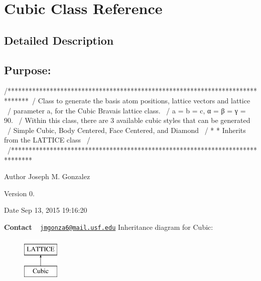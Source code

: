 \hypertarget{class_cubic}{}\section{Cubic Class Reference}
\label{class_cubic}


\subsection{Detailed Description}
\subsection*{{\bfseries Purpose\+:} }

\begin{DoxyVerb}/******************************************************************************\
/  Class to generate the basis atom positions, lattice vectors and lattice     \
/  parameter a, for the Cubic Bravais lattice class.                           \
/  a = b = c, α = β = γ = 90.                                                  \
/  Within this class, there are 3 available cubic styles that can be generated \
/  Simple Cubic, Body Centered, Face Centered, and Diamond                     \
/  * * Inherits from the LATTICE class                                         \
/                                                                              \ 
/******************************************************************************\
\end{DoxyVerb}


\begin{DoxyAuthor}{Author}
Joseph M. Gonzalez
\end{DoxyAuthor}
\begin{DoxyVersion}{Version}
0.\+1
\end{DoxyVersion}
\begin{DoxyDate}{Date}
Sep 13, 2015 19\+:16\+:20
\end{DoxyDate}
{\bfseries Contact} ~\newline
 \href{mailto:jmgonza6@mail.usf.edu}{\tt jmgonza6@mail.\+usf.\+edu} Inheritance diagram for Cubic\+:\begin{figure}[H]
\begin{center}
\leavevmode
\includegraphics[height=2.000000cm]{class_cubic}
\end{center}
\end{figure}
